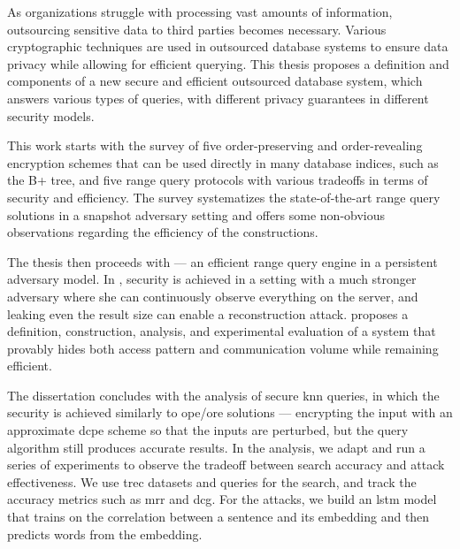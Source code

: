 As organizations struggle with processing vast amounts of information, outsourcing sensitive data to third parties becomes necessary.
Various cryptographic techniques are used in outsourced database systems to ensure data privacy while allowing for efficient querying.
This thesis proposes a definition and components of a new secure and efficient outsourced database system, which answers various types of queries, with different privacy guarantees in different security models.

This work starts with the survey of five order-preserving and order-revealing encryption schemes that can be used directly in many database indices, such as the B+ tree, and five range query protocols with various tradeoffs in terms of security and efficiency.
The survey systematizes the state-of-the-art range query solutions in a snapshot adversary setting and offers some non-obvious observations regarding the efficiency of the constructions.

The thesis then proceeds with \epsolute{} --- an efficient range query engine in a persistent adversary model.
In \epsolute{}, security is achieved in a setting with a much stronger adversary where she can continuously observe everything on the server, and leaking even the result size can enable a reconstruction attack.
\epsolute{} proposes a definition, construction, analysis, and experimental evaluation of a system that provably hides both access pattern and communication volume while remaining efficient.

The dissertation concludes with the analysis of secure \acrlong{knn} queries, in which the security is achieved similarly to \acrshort{ope}/\acrshort{ore} solutions --- encrypting the input with an approximate \acrlong{dcpe} scheme so that the inputs are perturbed, but the query algorithm still produces accurate results.
In the analysis, we adapt and run a series of experiments to observe the tradeoff between search accuracy and attack effectiveness.
We use \acrshort{trec} datasets and queries for the search, and track the accuracy metrics such as \acrshort{mrr} and \acrshort{dcg}.
For the attacks, we build an \acrshort{lstm} model that trains on the correlation between a sentence and its embedding and then predicts words from the embedding.
